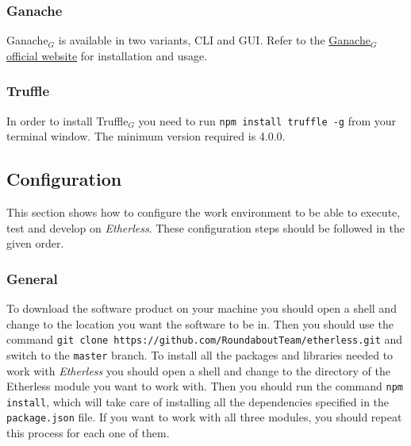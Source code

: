 \subsubsection{Ganache}
	Ganache$_{G}$ is available in two variants, CLI and GUI. Refer to the \href{https://www.trufflesuite.com/docs/ganache/quickstart}{Ganache$_{G}$ official website} for installation and usage.
\subsubsection{Truffle}
 In order to install Truffle$_{G}$ you need to run \texttt{npm install truffle -g} from your terminal window. The minimum version required is 4.0.0.
\subsection{Configuration}
This section shows how to configure the work environment to be able to execute, test and develop on \textit{Etherless}. These configuration steps should be followed in the given order.
\subsubsection{General}
To download the software product on your machine you should open a shell and change to the location you want the software to be in. Then you should use the command \texttt{git clone https://github.com/RoundaboutTeam/etherless.git} and switch to the \texttt{master} branch.
To install all the packages and libraries needed to work with \textit{Etherless} you should open a shell and change to the directory of the Etherless module you want to work with. Then you should run the command \texttt{npm install}, which will take care of installing all the dependencies specified in the \texttt{package.json} file. If you want to work with all three modules, you should repeat this process for each one of them.
